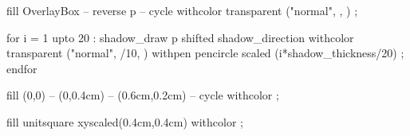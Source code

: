   fill OverlayBox -- reverse p -- cycle
       withcolor transparent ("normal",
         ,
         ) ;
\stopuseMPgraphic


  for i = 1 upto 20 :
  shadow_draw p shifted shadow_direction 
       withcolor transparent ("normal",
         /10, %
         ) 
       withpen pencircle scaled (i*shadow_thickness/20) ;
  endfor 
\stopuseMPgraphic



  fill (0,0) -- (0,0.4cm) -- (0.6cm,0.2cm) -- cycle 
       withcolor  ;
\stopuniqueMPgraphic

  fill unitsquare xyscaled(0.4cm,0.4cm) 
       withcolor  ;
\stopuniqueMPgraphic



\protect

\stopmodule
